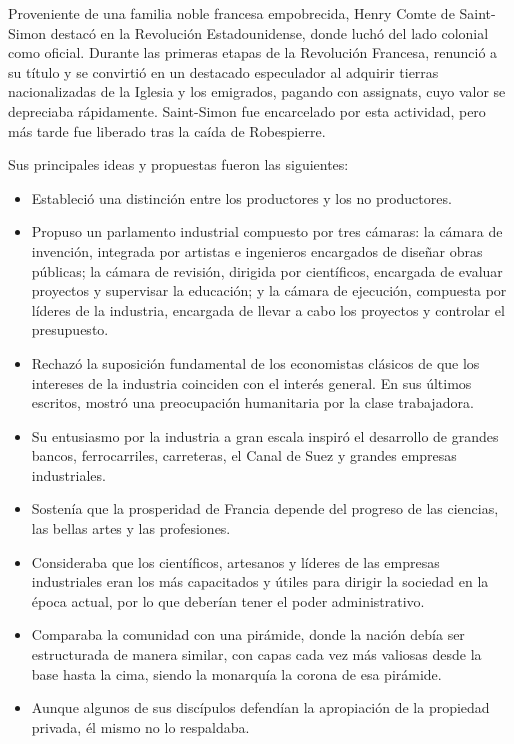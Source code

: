 \documentclass[
  jou,
  floatsintext,
  longtable,
  a4paper,
  nolmodern,
  notxfonts,
  notimes,
  12pt,
  colorlinks=true,linkcolor=blue,citecolor=blue,urlcolor=blue]{apa7}
\providecommand{\tightlist}{%
  \setlength{\itemsep}{0pt}\setlength{\parskip}{0pt}}
\begin{document}
Proveniente de una familia noble francesa empobrecida, Henry Comte de
Saint-Simon destacó en la Revolución Estadounidense, donde luchó del
lado colonial como oficial. Durante las primeras etapas de la Revolución
Francesa, renunció a su título y se convirtió en un destacado
especulador al adquirir tierras nacionalizadas de la Iglesia y los
emigrados, pagando con assignats, cuyo valor se depreciaba rápidamente.
Saint-Simon fue encarcelado por esta actividad, pero más tarde fue
liberado tras la caída de Robespierre.

Sus principales ideas y propuestas fueron las siguientes:

\begin{itemize}
\tightlist
\item
  Estableció una distinción entre los productores y los no productores.
\item
  Propuso un parlamento industrial compuesto por tres cámaras: la cámara
  de invención, integrada por artistas e ingenieros encargados de
  diseñar obras públicas; la cámara de revisión, dirigida por
  científicos, encargada de evaluar proyectos y supervisar la educación;
  y la cámara de ejecución, compuesta por líderes de la industria,
  encargada de llevar a cabo los proyectos y controlar el presupuesto.
\item
  Rechazó la suposición fundamental de los economistas clásicos de que
  los intereses de la industria coinciden con el interés general. En sus
  últimos escritos, mostró una preocupación humanitaria por la clase
  trabajadora.
\item
  Su entusiasmo por la industria a gran escala inspiró el desarrollo de
  grandes bancos, ferrocarriles, carreteras, el Canal de Suez y grandes
  empresas industriales.
\item
  Sostenía que la prosperidad de Francia depende del progreso de las
  ciencias, las bellas artes y las profesiones.
\item
  Consideraba que los científicos, artesanos y líderes de las empresas
  industriales eran los más capacitados y útiles para dirigir la
  sociedad en la época actual, por lo que deberían tener el poder
  administrativo.
\item
  Comparaba la comunidad con una pirámide, donde la nación debía ser
  estructurada de manera similar, con capas cada vez más valiosas desde
  la base hasta la cima, siendo la monarquía la corona de esa pirámide.
\item
  Aunque algunos de sus discípulos defendían la apropiación de la
  propiedad privada, él mismo no lo respaldaba.
\end{itemize}
\end{document}
